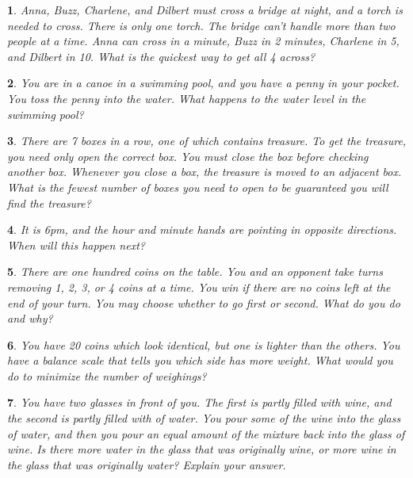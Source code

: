 \documentclass{report}
\newtheorem{problem}{}
\numberwithin{problem}{chapter} %
\begin{document}
\begin{problem}
Anna, Buzz, Charlene, and Dilbert must cross a bridge at night, and a torch is needed to cross. There is only one torch. The bridge can't handle more than two people at a time. Anna can cross in a minute, Buzz in 2 minutes, Charlene in 5, and Dilbert in 10. What is the quickest way to get all 4 across?
\end{problem}

\begin{problem}
You are in a canoe in a swimming pool, and you have a penny in your pocket. You toss the penny into the water. What happens to the water level in the swimming pool?
\end{problem}

\begin{problem}
There are 7 boxes in a row, one of which contains treasure. To get the treasure, you need only open the correct box. You must close the box before checking another box. Whenever you close a box, the treasure is moved to an adjacent box. What is the fewest number of boxes you need to open to be guaranteed you will find the treasure?
\end{problem}

\begin{problem}
It is 6pm, and the hour and minute hands are pointing in opposite directions. When will this happen next?
\end{problem}

\begin{problem}
There are one hundred coins on the table. You and an opponent take turns removing 1, 2, 3, or 4 coins at a time. You win if there are no coins left at the end of your turn. You may choose whether to go first or second. What do you do and why?
\end{problem}

\begin{problem}
You have 20 coins which look identical, but one is lighter than the others. You have a balance scale that tells you which side has more weight. What would you do to minimize the number of weighings?
\end{problem}

\begin{problem}
You have two glasses in front of you. The first is partly filled with wine, and the second is partly filled with of water. You pour some of the wine into the glass of water, and then you pour an equal amount of the mixture back into the glass of wine. Is there more water in the glass that was originally wine, or more wine in the glass that was originally water? Explain your answer.
\end{problem}
\end{document}
